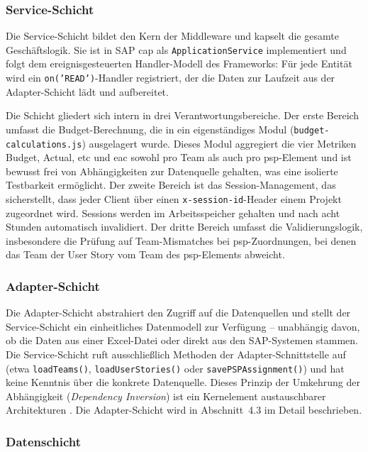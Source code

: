 \subsubsection{Service-Schicht}

Die Service-Schicht bildet den Kern der Middleware und kapselt die gesamte Geschäftslogik. Sie ist in SAP \gls{cap} als \texttt{ApplicationService} implementiert und folgt dem ereignisgesteuerten Handler-Modell des Frameworks: Für jede Entität wird ein \texttt{on('READ')}-Handler registriert, der die Daten zur Laufzeit aus der Adapter-Schicht lädt und aufbereitet.

Die Schicht gliedert sich intern in drei Verantwortungsbereiche. Der erste Bereich umfasst die Budget-Berechnung, die in ein eigenständiges Modul (\texttt{budget-calculations.js}) ausgelagert wurde. Dieses Modul aggregiert die vier Metriken Budget, Actual, \gls{etc} und \gls{eac} sowohl pro Team als auch pro \gls{psp}-Element und ist bewusst frei von Abhängigkeiten zur Datenquelle gehalten, was eine isolierte Testbarkeit ermöglicht. Der zweite Bereich ist das Session-Management, das sicherstellt, dass jeder Client über einen \texttt{x-session-id}-Header einem Projekt zugeordnet wird. Sessions werden im Arbeitsspeicher gehalten und nach acht Stunden automatisch invalidiert. Der dritte Bereich umfasst die Validierungslogik, insbesondere die Prüfung auf Team-Mismatches bei \gls{psp}-Zuordnungen, bei denen das Team der User Story vom Team des \gls{psp}-Elements abweicht.

\subsubsection{Adapter-Schicht}

Die Adapter-Schicht abstrahiert den Zugriff auf die Datenquellen und stellt der Service-Schicht ein einheitliches Datenmodell zur Verfügung -- unabhängig davon, ob die Daten aus einer Excel-Datei oder direkt aus den SAP-Systemen stammen. Die Service-Schicht ruft ausschließlich Methoden der Adapter-Schnittstelle auf (etwa \texttt{loadTeams()}, \texttt{loadUserStories()} oder \texttt{savePSPAssignment()}) und hat keine Kenntnis über die konkrete Datenquelle. Dieses Prinzip der Umkehrung der Abhängigkeit (\textit{Dependency Inversion}) ist ein Kernelement austauschbarer Architekturen \citep{gamma1994}. Die Adapter-Schicht wird in Abschnitt~4.3 im Detail beschrieben.

\subsubsection{Datenschicht}

